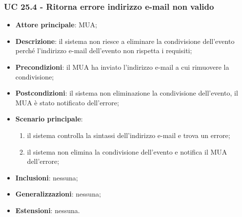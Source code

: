     \subsubsection{UC 25.4 - Ritorna errore indirizzo e-mail non valido} \label{sec:UC25.4}
    \begin{itemize}
        \item \textbf{Attore principale}: MUA;
        \item \textbf{Descrizione}: il sistema non riesce a eliminare la condivisione dell'evento perché l'indirizzo e-mail dell'evento non rispetta i requisiti;
        \item \textbf{Precondizioni}: il MUA ha inviato l'indirizzo e-mail a cui rimuovere la condivisione;
        \item \textbf{Postcondizioni}: il sistema non eliminazione la condivisione dell'evento, il MUA è stato notificato dell'errore;
        \item \textbf{Scenario principale}:
            \begin{enumerate}
                \item il sistema controlla la sintassi dell'indirizzo e-mail e trova un errore;
                \item il sistema non elimina la condivisione dell'evento e notifica il MUA dell'errore;
            \end{enumerate}
        \item \textbf{Inclusioni}: nessuna;
        \item \textbf{Generalizzazioni}: nessuna;
        \item \textbf{Estensioni}: nessuna.
    \end{itemize}
